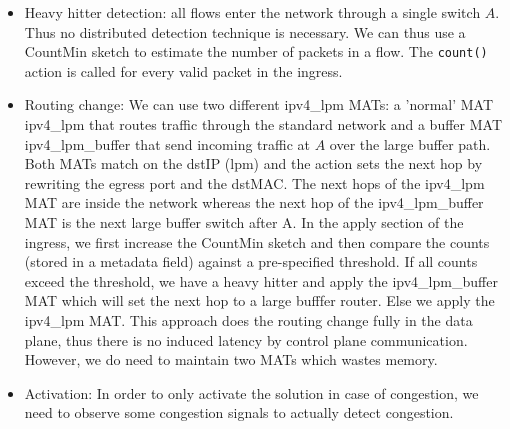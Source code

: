 \documentclass[11pt,oneside,a4paper]{article}
\begin{document}
\vspace{-\topsep}
\begin{itemize}
	\setlength{\itemsep}{0pt}
	\setlength{\parskip}{0pt}
	\item Heavy hitter detection: all flows enter the network through a single switch $A$. Thus no distributed detection technique is necessary. We can thus use a CountMin sketch to estimate the number of packets in a flow. The \texttt{count()} action is called for every valid packet in the ingress.
	\item Routing change: We can use two different ipv4\_lpm MATs: a 'normal' MAT ipv4\_lpm that routes traffic through the standard network and a buffer MAT ipv4\_lpm\_buffer that send incoming traffic at $A$ over the large buffer path. Both MATs match on the dstIP (lpm) and the action sets the next hop by rewriting the egress port and the dstMAC. The next hops of the ipv4\_lpm MAT are inside the network whereas the next hop of the ipv4\_lpm\_buffer MAT is the next large buffer switch after A. In the apply section of the ingress, we first increase the CountMin sketch and then compare the counts (stored in a metadata field) against a pre-specified threshold. If all counts exceed the threshold, we have a heavy hitter and apply the ipv4\_lpm\_buffer MAT which will set the next hop to a large bufffer router. Else we apply the ipv4\_lpm MAT. This approach does the routing change fully in the data plane, thus there is no induced latency by control plane communication. However, we do need to maintain two MATs which wastes memory.
	\item Activation: In order to only activate the solution in case of congestion, we need to observe some congestion signals to actually detect congestion. 
\end{itemize}
\vspace{-\topsep}

\label{lastpage} %
\clearpage
{}



\clearpage
\appendix
{}
\end{document}

